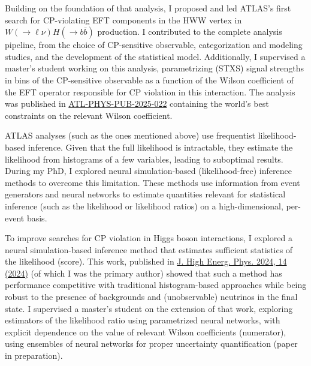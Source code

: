 \documentclass[11pt, a4paper]{awesome-cv}
\begin{document}
\begin{cvletter}
  Building on the foundation of that analysis, I proposed and led ATLAS's first search for CP-violating EFT components in the HWW vertex in $W(\to \ell \nu)H(\to b\bar{b})$ production. I contributed to the complete analysis pipeline, from the choice of CP-sensitive observable, categorization and modeling studies, and the development of the statistical model. Additionally, I supervised a master's student working on this analysis, parametrizing (STXS) signal strengths in bins of the CP-sensitive observable as a function of the Wilson coefficient of the EFT operator responsible for CP violation in this interaction. The analysis was published in \href{https://atlas.web.cern.ch/Atlas/GROUPS/PHYSICS/PUBNOTES/ATL-PHYS-PUB-2025-022/}{ATL-PHYS-PUB-2025-022} containing the world's best constraints on the relevant Wilson coefficient.
  
  
  ATLAS analyses (such as the ones mentioned above) use frequentist likelihood-based inference. Given that the full likelihood is intractable, they estimate the likelihood from histograms of a few variables, leading to suboptimal results. During my PhD, I explored neural simulation-based (likelihood-free) inference methods to overcome this limitation. These methods use information from event generators and neural networks to estimate quantities relevant for statistical inference (such as the likelihood or likelihood ratios) on a high-dimensional, per-event basis.
  
  To improve searches for CP violation in Higgs boson interactions, I explored a neural simulation-based inference method that estimates sufficient statistics of the likelihood (score). This work, published in \href{https://doi.org/10.1007/JHEP04(2024)014}{J. High Energ. Phys. 2024, 14 (2024)} (of which I was the primary author) showed that such a method has performance competitive with traditional histogram-based approaches while being robust to the presence of backgrounds and (unobservable) neutrinos in the final state. I supervised a master's student on the extension of that work, exploring estimators of the likelihood ratio using parametrized neural networks, with explicit dependence on the value of relevant Wilson coefficients (numerator), using ensembles of neural networks for proper uncertainty quantification (paper in preparation).
  
  

\end{cvletter}
\end{document}
